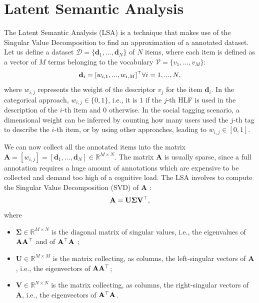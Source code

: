\section{Latent Semantic Analysis}\label{app:LSA}
The Latent Semantic Analysis (LSA) is a technique that makes use of the Singular Value Decomposition to find an approximation of a annotated dataset. Let us define a dataset $\mathcal{D}=\{\mathbf{d}_1,...,\mathbf{d}_N\}$ of $N$ items, where each item is defined as a vector of $M$ terms belonging to the vocabulary $\mathcal{V}=\{v_1, ..., v_M\}$:
\begin{equation}
\mathbf{d}_i=[ w_{i,1}, ..., w_{i,M} ]^\top \forall i=1,...,N, 
\end{equation}
where $w_{i,j}$ represents the weight of the descriptor $v_j$ for the item $\mathbf{d}_i$. In the categorical approach, $w_{i,j}\in\{0,1\}$, i.e., it is $1$ if the $j$-th HLF is used in the description of the $i$-th item and $0$ otherwise. In the social tagging scenario, a dimensional weight can be inferred by counting how many users used the $j$-th tag to describe the $i$-th item, or by using other approaches, leading to $w_{i,j}\in[0,1]$. 

We can now collect all the annotated items into the matrix $\mathbf{A}=[w_{i,j}]=[\mathbf{d}_1,...,\mathbf{d}_N] \in \mathbb{R}^{M\times N}$. 
The matrix $\mathbf{A}$ is usually sparse, since a full annotation requires a huge amount of annotations which are expensive to be collected and demand too high of a cognitive load. The LSA involves to compute the Singular Value Decomposition (SVD) of \textbf{A} \cite{dumais2004latent}:
\begin{equation}
\mathbf{A}=\mathbf{U} \mathbf{\Sigma} \mathbf{V}^\top,
\end{equation}
where 
\begin{itemize}
	\item $\mathbf{\Sigma}\in \mathbb{R}^{M\times N}$ is the diagonal matrix of singular values, i.e., the eigenvalues of $\mathbf{A}\mathbf{A}^\top$ and of $\mathbf{A}^\top \mathbf{A}$ ;
	\item $\mathbf{U}\in \mathbb{R}^{M\times M}$ is the matrix collecting, as columns, the left-singular vectors of $\mathbf{A}$, i.e., the eigenvectors of  $\mathbf{A} \mathbf{A}^\top$;
	\item $\mathbf{V}\in \mathbb{R}^{N\times N}$ is the matrix collecting, as columns, the right-singular vectors of $\mathbf{A}$, i.e., the eigenvectors of $\mathbf{A}^\top \mathbf{A}$.
\end{itemize}

